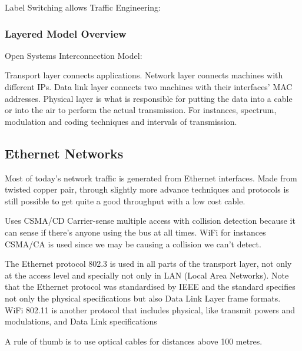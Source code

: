 Label Switching allows Traffic Engineering:





\subsubsection{Layered Model Overview}
Open Systems Interconnection Model:


Transport layer connects applications.
Network layer connects machines with different IPs.
Data link layer connects two machines with their interfaces' MAC addresses.
Physical layer is what is responsible for putting the data into a cable or into the air to perform the actual transmission. For instances, spectrum, modulation and coding techniques and intervals of transmission.









\subsection{Ethernet Networks}

Most of today's network traffic is generated from Ethernet interfaces. Made from twisted copper pair, through slightly more advance techniques and protocols is still possible to get quite a good throughput with a low cost cable.

Uses CSMA/CD Carrier-sense multiple access with collision detection because it can sense if there's anyone using the bus at all times. WiFi for instances CSMA/CA is used since we may be causing a collision we can't detect.

The Ethernet protocol 802.3 is used in all parts of the transport layer, not only at the access level and specially not only in LAN (Local Area Networks). Note that the Ethernet protocol was standardised by IEEE and the standard specifies not only the physical specifications but also Data Link Layer frame formats.
WiFi 802.11 is another protocol that includes physical, like transmit powers and modulations, and Data Link specifications 

A rule of thumb is to use optical cables for distances above 100 metres.


